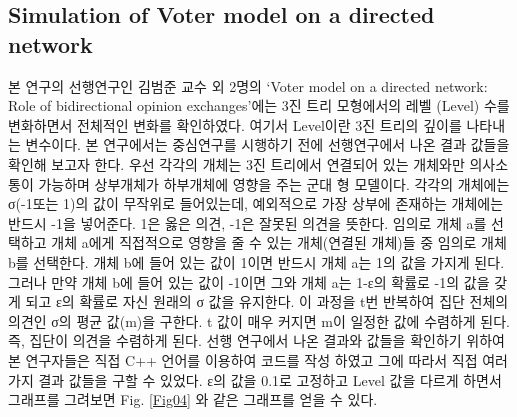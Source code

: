 \documentclass{gshs-report-v1.2}
\begin{document}
\subsection{Simulation of Voter model on a directed network}

본 연구의 선행연구인 김범준 교수 외 2명의 ‘Voter model on a directed network: Role of bidirectional opinion exchanges’에는 3진 트리 모형에서의 레벨 (Level) 수를 변화하면서 전체적인 변화를 확인하였다. 여기서 Level이란 3진 트리의 깊이를 나타내는 변수이다.
본 연구에서는 중심연구를 시행하기 전에 선행연구에서 나온 결과 값들을 확인해 보고자 한다.
우선 각각의 개체는 3진 트리에서 연결되어 있는 개체와만 의사소통이 가능하며 상부개체가 하부개체에 영향을 주는 군대 형 모델이다. 각각의 개체에는  σ(-1또는 1)의 값이 무작위로 들어있는데, 예외적으로 가장 상부에 존재하는 개체에는 반드시 -1을 넣어준다. 1은 옳은 의견, -1은 잘못된 의견을 뜻한다.  임의로 개체 a를 선택하고 개체 a에게 직접적으로 영향을 줄 수 있는 개체(연결된 개체)들 중 임의로 개체 b를 선택한다. 개체 b에 들어 있는 값이 1이면 반드시 개체 a는 1의 값을 가지게 된다. 그러나 만약 개체 b에 들어 있는 값이 -1이면 그와 개체 a는 1-ε의 확률로 -1의 값을 갖게 되고 ε의 확률로 자신 원래의 σ 값을 유지한다. 이 과정을 t번 반복하여 집단 전체의 의견인 σ의 평균 값(m)을 구한다. t 값이 매우 커지면 m이 일정한 값에 수렴하게 된다. 즉, 집단이 의견을 수렴하게 된다.
선행 연구에서 나온 결과와 값들을 확인하기 위하여 본 연구자들은 직접 C++ 언어를 이용하여 코드를 작성 하였고 그에 따라서 직접 여러 가지 결과 값들을 구할 수 있었다.
ε의 값을 0.1로 고정하고 Level 값을 다르게 하면서 그래프를 그려보면 Fig. \ref{Fig04} 와 같은 그래프를 얻을 수 있다.
 
\end{document}
